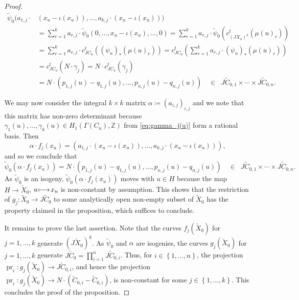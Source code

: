\documentclass[a4paper,11pt,reqno]{amsart}
\makeatletter
\numberwithin{equation}{section}
\theoremstyle{plain}
\theoremstyle{definition}
\newcommand{\Z}{\mathbb Z}
\newcommand{\pr}{\operatorname{pr}}
\newcommand{\wt}[1]{{\widetilde{#1}}}
\renewcommand{\mapsto}{\xymatrix@1@=15pt{\ar@{|->}[r]&}}
\newcommand{\set}[1]{\left\{ #1 \right\}}
\makeatother
\begin{document}
\begin{proof}
\begin{align*}
\wt \psi_0
(
a_{1,j} \cdot &(x_u-\iota(x_u)), \dotsc, 
a_{k,j} \cdot (x_u-\iota(x_u))
)  \\
&
= 
\sum_{r = 1}^k a_{r,j} \cdot 
\wt \psi_0 
\left(
0, \dotsc, x_u - \iota(x_u), \dotsc, 0
\right)= 
\sum_{r = 1}^k a_{r,j} \cdot 
\wt \psi_0 \left(
c^t_{(JX_u)^k}(\mu(u)_r)
\right) \\
&= 
\sum_{r = 1}^k a_{r,j} \cdot c^t_{JC_u}\left(
(\psi_u)_\ast(\mu(u)_r)
\right) 
=
c^t_{JC_u}
\left(
\sum_{r = 1}^k a_{r,j} \cdot (\psi_u)_\ast (\mu(u)_r)
\right)  \\
& = 
c^t_{JC_u}\left(
N \cdot \gamma_{j} 
\right) 
=
N \cdot 
c^t_{JC_u}(\gamma_{j}) \\
&
=
N \cdot  \left(p_{1,j}(u)- q_{1,j}(u), \dotsc, p_{n,j}(u) - q_{n,j}(u)\right)
\quad \in \;\; J \wt C_{0,1} \times \cdots \times J \wt C_{0,n}.
\end{align*}

We may now consider the integral $k\times k$ matrix $\alpha \coloneqq (a_{i,j})_{i,j}$ and we note that this matrix has non-zero determinant because 
$\gamma_1(u),\dots ,\gamma_k(u) \in H_1(\Gamma(C_u),\Z)$ from \eqref{eq:gamma_j(u)} form a rational basis.
Then 
\[
\alpha \cdot f_j(x_u) = 
\left(
a_{1,j} \cdot (x_u-\iota(x_u)), \dotsc, 
a_{k,j} \cdot (x_u-\iota(x_u))
\right),
\] 
and so 
we conclude that
\[
\wt \psi_0 \left(
\alpha \cdot f_j(x_u)
\right)
= 
N \cdot  \left(p_{1,j}(u)- q_{1,j}(u), \dotsc, p_{n,j}(u) - q_{n,j}(u)\right)
\quad \in \;\; J \wt C_{0,1} \times \cdots \times J \wt C_{0,n}.
\]  
As $\wt \psi_0$ is an isogeny, $\wt \psi_0 \left(
\alpha \cdot f_j(x_u)
\right)$ moves with $u\in H$ because the map $H\to \widetilde X_0$, $u\mapsto x_u$ is non-constant by assumption. 
This shows that the restriction of $g_j \colon \widetilde X_0\to J\widetilde C_0$ to some analytically open non-empty subset of $\widetilde X_0$ has the property claimed in the proposition, which suffices to conclude. 

It remains to prove the last assertion. Note that the curves $f_j(\wt X_0)$ for $j = 1, \dotsc, k$ generate $(J \wt X_0)^k$. As $\wt \psi_0$ and $\alpha$ are isogenies, the curves $g_j(\wt X_0)$ for $j = 1, \dotsc, k$ generate $J \wt C_0 = \prod_{i = 1}^n J \wt C_{0,i}$. Thus, for $i \in \set{1, \dotsc, n}$, the projection $\pr_i \colon g_j(\wt X_0) \to J \wt C_{0,i}$, and hence the projection $\pr_i \colon g_j(\wt X_0) \to N \cdot (\wt C_{0,i} - \wt C_{0,i})$, is non-constant for some $j \in \set{1, \dotsc, k}$. 
This concludes the proof of the proposition.
\end{proof}
\end{document}

